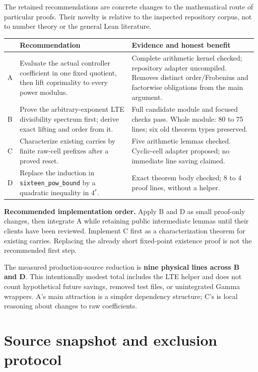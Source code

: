 \documentclass[11pt]{article}
\newcommand{\code}[1]{\nolinkurl{#1}}
\begin{document}
The retained recommendations are concrete changes to the mathematical route of
particular proofs. Their novelty is relative to the inspected repository
corpus, not to number theory or the general Lean literature.

\begin{tabularx}{\textwidth}{@{}p{0.5cm}>{\raggedright\arraybackslash}X >{\raggedright\arraybackslash}X@{}}
\toprule
 & Recommendation & Evidence and honest benefit\\
\midrule
A & Evaluate the actual controller coefficient in one fixed quotient, then lift coprimality to every power modulus. & Complete arithmetic kernel checked; repository adapter uncompiled. Removes distinct order/Frobenius and factorwise obligations from the main argument.\\[5pt]
B & Prove the arbitrary-exponent LTE divisibility spectrum first; derive exact lifting and order from it. & Full candidate module and focused checks pass. Whole module: 80 to 75 lines; six old theorem types preserved.\\[5pt]
C & Characterize existing carries by finite raw-cell prefixes after a proved reset. & Five arithmetic lemmas checked. Cyclic-cell adapter proposed; no immediate line saving claimed.\\[5pt]
D & Replace the induction in \code{sixteen_pow_bound} by a quadratic inequality in \(4^r\). & Exact theorem body checked; 8 to 4 proof lines, without a helper.\\
\bottomrule
\end{tabularx}

\textbf{Recommended implementation order.} Apply B and D as small proof-only
changes, then integrate A while retaining public intermediate lemmas until their
clients have been reviewed. Implement C first as a characterization theorem for
existing carries. Replacing the already short fixed-point existence proof is
not the recommended first step.

The measured production-source reduction is \textbf{nine physical lines across
B and D}. This intentionally modest total includes the LTE helper and does not
count hypothetical future savings, removed test files, or unintegrated Gamma
wrappers. A's main attraction is a simpler dependency structure; C's is local
reasoning about changes to raw coefficients.

\newpage
\setcounter{tocdepth}{1}
\tableofcontents
\newpage

\section{Source snapshot and exclusion protocol}
\end{document}
